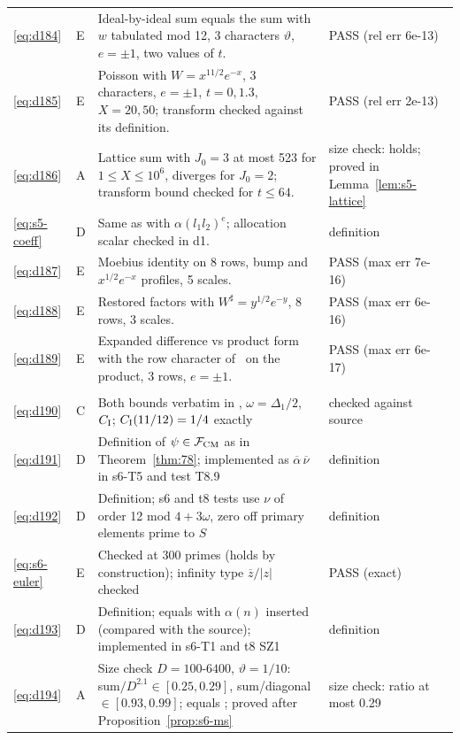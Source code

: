 \documentclass[11pt]{article}
\numberwithin{equation}{section}
\begin{document}
\begin{longtable}{@{}>{\raggedright\arraybackslash}p{1.2cm}>{\centering\arraybackslash}p{0.7cm}>{\raggedright\arraybackslash}p{9.05cm}>{\raggedright\arraybackslash}p{4.3cm}@{}}
\eqref{eq:d184} & E & Ideal-by-ideal sum equals the sum with $w$ tabulated mod 12, 3 characters $\vartheta$, $e=\pm1$, two values of $t$. & PASS (rel err 6e-13)\\
\eqref{eq:d185} & E & Poisson with $W=x^{11/2}e^{-x}$, 3 characters, $e=\pm1$, $t=0,1.3$, $X=20,50$; transform checked against its definition. & PASS (rel err 2e-13)\\
\eqref{eq:d186} & A & Lattice sum with $J_0=3$ at most 523 for $1\le X\le10^6$, diverges for $J_0=2$; transform bound checked for $t\le64$. & size check: holds; proved in Lemma~\ref{lem:s5-lattice}\\
\eqref{eq:s5-coeff} & D & Same as \cite[eq.~(18.18)]{OAI78} with $\alpha(l_1l_2)^e$; allocation scalar checked in d1. & definition\\
\eqref{eq:d187} & E & Moebius identity on 8 rows, bump and $x^{1/2}e^{-x}$ profiles, 5 scales. & PASS (max err 7e-16)\\
\eqref{eq:d188} & E & Restored factors with $W^\sharp=y^{1/2}e^{-y}$, 8 rows, 3 scales. & PASS (max err 6e-16)\\
\eqref{eq:d189} & E & Expanded difference vs product form with the row character of~\cite{OAI78} on the product, 3 rows, $e=\pm1$. & PASS (max err 6e-17)\\
\multicolumn{4}{@{}l}{\emph{Appendix~G}}\\
\eqref{eq:d190} & C & Both bounds verbatim in \cite{OAI78}, $\omega=\Delta_1/2$, $C_{\rm I}$; $C_{\rm I}(11/12)=1/4$ exactly & checked against source\\
\eqref{eq:d191} & D & Definition of $\psi\in\mathcal F_{\rm CM}$ as in Theorem~\ref{thm:78}; implemented as $\overline\alpha\,\overline\nu$ in s6-T5 and test T8.9 & definition\\
\eqref{eq:d192} & D & Definition; s6 and t8 tests use $\nu$ of order 12 mod $4+3\omega$, zero off primary elements prime to $S$ & definition\\
\eqref{eq:s6-euler} & E & Checked at 300 primes (holds by construction); infinity type $\overline z/|z|$ checked & PASS (exact)\\
\eqref{eq:d193} & D & Definition; equals \cite{OAI1112} with $\alpha(n)$ inserted (compared with the source); implemented in s6-T1 and t8 SZ1 & definition\\
\eqref{eq:d194} & A & Size check $D=100$-$6400$, $\vartheta=1/10$: sum$/D^{2.1}\in[0.25,0.29]$, sum/diagonal $\in[0.93,0.99]$; equals \cite[eq.~(3.1)]{OAI1112}; proved after Proposition~\ref{prop:s6-ms} & size check: ratio at most 0.29\\

\end{longtable}
\end{document}
